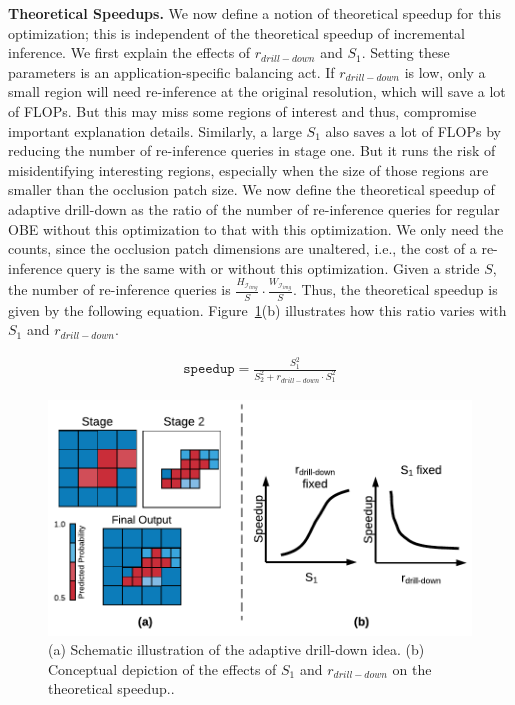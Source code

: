 \vspace{2mm}
\noindent \textbf{Theoretical Speedups.}
We now define a notion of theoretical speedup for this optimization; this is independent of the theoretical speedup of incremental inference. We first explain the effects of $r_{\mathit{drill}-\mathit{down}}$ and $S_1$. Setting these parameters is an application-specific balancing act. If $r_{\mathit{drill}-\mathit{down}}$ is low, only a small region will need re-inference at the original resolution, which will save a lot of FLOPs. But this may miss some regions of interest and thus, compromise important explanation details. Similarly, a large $S_1$ also saves a lot of FLOPs by reducing the number of re-inference queries in stage one. But it runs the risk of misidentifying interesting regions, especially when the size of those regions are smaller than the occlusion patch size. We now define the theoretical speedup of adaptive drill-down as the ratio of the number of re-inference queries for regular OBE without this optimization to that with this optimization. We only need the counts, since the occlusion patch dimensions are unaltered, i.e., the cost of a re-inference query is the same with or without this optimization. Given a stride $S$, the number of re-inference queries is $\frac{H_{\mathcal{I}_\mathit{img}}}{S} \cdot \frac{W_{\mathcal{I}_\mathit{img}}}{S}$. Thus, the theoretical speedup is given by the following equation. Figure~\ref{fig:adaptive_drill_down}(b) illustrates how this ratio varies with $S_1$ and $r_{\mathit{drill}-\mathit{down}}$.

\vspace{-2mm}
\begin{align}
\label{eqn:adaptive-drill-down-eqn}
\texttt{speedup} = \frac{S^2_1}{S^2_2+r_{\mathit{drill}-\mathit{down}} \cdot S^2_1}
\end{align}

\begin{figure}[t]
\includegraphics[width=\columnwidth]{images/adaptive_drill_down}
\vspace{-8mm}
\caption{(a) Schematic illustration of the adaptive drill-down idea. (b) Conceptual depiction of the effects of $S_1$ and $r_{\mathit{drill}-\mathit{down}}$ on the theoretical speedup.. }
\label{fig:adaptive_drill_down}
\vspace{-2mm}
\end{figure}

